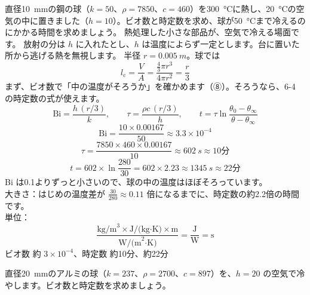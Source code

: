 \label{ph:熱-11:ex6}
\begin{phreidai}[小さな鋼の球を空気で冷やす]
直径\qty{10}{mm}の鋼の球（$k=50$、$\rho=7850$、$c=460$）を\qty{300}{\celsius}に熱し、\qty{20}{\celsius}の空気の中に置きました（$h=10$）。ビオ数と時定数を求め、球が\qty{50}{\celsius}まで冷えるのにかかる時間を求めましょう。
\phbamen
熱処理した小さな部品が、空気で冷える場面です。
\phmushi
放射の分は $h$ に入れたとし、$h$ は温度によらず一定とします。台に置いた所から逃げる熱を無視します。
\phzu
半径 $r=\qty{0.005}{m}$。球では\[l_{\mathrm c}=\frac{V}{A}=\frac{\frac43\pi r^3}{4\pi r^2}=\frac{r}{3}\]
\phriyu
まず、ビオ数で「中の温度がそろうか」を確かめます（⑧）。そろうなら、6-4 の時定数の式が使えます。
\phtateru
\[\mathrm{Bi}=\frac{h\,(r/3)}{k},\qquad\tau=\frac{\rho c\,(r/3)}{h},\qquad t=\tau\ln\frac{\theta_0-\theta_\infty}{\theta-\theta_\infty}\]
\phtoku
\[\mathrm{Bi}=\frac{10\times0.00167}{50}\approx3.3\times10^{-4}\]
\[\tau=\frac{7850\times460\times0.00167}{10}\approx\qty{602}{s}\approx10\text{分}\]
\[t=602\times\ln\frac{280}{30}=602\times2.23\approx\qty{1345}{s}\approx22\text{分}\]
\phtashikame
Bi は0.1よりずっと小さいので、球の中の温度はほぼそろっています。\\
大きさ：はじめの温度差が $\tfrac{30}{280}\approx0.11$ 倍になるまでに、時定数の約2.2倍の時間です。\\
単位：\[\frac{\text{kg/m}^3\times\text{J/(kg·K)}\times\text{m}}{\text{W/(m}^2\text{·K)}}=\frac{\text{J}}{\text{W}}=\text{s}\]
\kotae ビオ数 約 $3\times10^{-4}$、時定数 約10分、約22分
\end{phreidai}
\begin{jibun}
直径\qty{20}{mm}のアルミの球（$k=237$、$\rho=2700$、$c=897$）を、$h=20$ の空気で冷やします。ビオ数と時定数を求めましょう。
\end{jibun}


